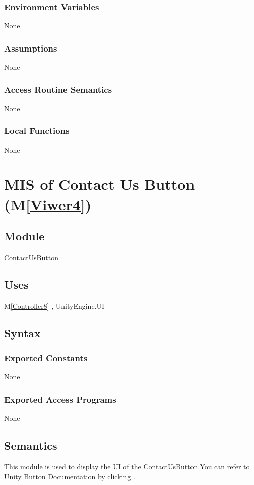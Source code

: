 \documentclass[12pt, titlepage]{article}
\newcommand{\mref}[1]{M\ref{#1}}
\begin{document}
\subsubsection{Environment Variables}
None
\subsubsection{Assumptions}
None
\subsubsection{Access Routine Semantics}
None
\subsubsection{Local Functions}
None

\newpage

\section{MIS of Contact Us Button (\mref{Viwer4})}

\subsection{Module}
ContactUsButton

\subsection{Uses}
\mref{Controller8}  , UnityEngine.UI

\subsection{Syntax}
\subsubsection{Exported Constants}
None
\subsubsection{Exported Access Programs}
None

\subsection{Semantics}
This module is used to display the UI of the ContactUsButton.You can refer to Unity Button Documentation by clicking \bref.
\end{document}
